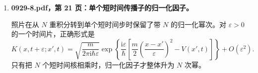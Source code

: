 \documentclass[UTF8,12pt,a4paper,fontset=fandol]{ctexart}
\begin{document}
\begin{enumerate}
\item \textbf{0929-8.pdf，第 21 页：单个短时间传播子的归一化因子。}

照片在从 $N$ 重积分转到单个短时间步时保留了带 $N$ 的归一化幂次。对
$\varepsilon>0$ 的一个时间片，正确形式是
\begin{equation}
K\left(x,t+\varepsilon;x',t\right)
=\sqrt{\frac{m}{2\pi\mathrm{i}\hbar\varepsilon}}
\exp\left\{\frac{\mathrm{i}\varepsilon}{\hbar}
\left[\frac{m}{2}\left(\frac{x-x'}{\varepsilon}\right)^2
-V\left(x',t\right)\right]\right\}+O\left(\varepsilon^2\right).
\end{equation}
只有把 $N$ 个短时间核相乘时，归一化因子才整体升为 $N$ 次幂。
\end{enumerate}
\end{document}
